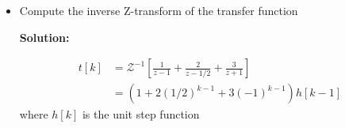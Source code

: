 \documentclass[twoside]{article}
\begin{document}
\begin{itemize}
\begin{align*}
  T(z) &= C \left( z I - G \right)^{-1} H \\
         &= \left[ \begin{array}{ccc} 1 & 2 & 3 \end{array} \right] 
\left[ \begin{array}{ccc} z-1 & 0 & 0\\ 0 & z-1/2 & 0
    \\ 0 & 0 & z+1 \end{array} \right]^{-1}            
\left[ \begin{array}{c} 1 \\ 1 \\ 1\end{array} \right]
\\
&= \left[ \begin{array}{ccc} 1 & 2 & 3 \end{array} \right] 
\left[ \begin{array}{ccc} \frac{1}{z-1} & 0 & 0\\ 0 & \frac{1}{z-1/2} & 0
    \\ 0 & 0 & \frac{1}{z+1} \end{array} \right]            
\left[ \begin{array}{c} 1 \\ 1 \\ 1\end{array} \right]                                        
\\
&= 
\left[ \begin{array}{ccc} 1 & 2 & 3 \end{array} \right] 
\left[ \begin{array}{c} \frac{1}{z-1} \\ \frac{1}{z-1/2} \\
         \frac{1}{z+1}\end{array} \right]          
\\
  T(z) &= \frac{1}{z-1} + \frac{2}{z-1/2} + \frac{3}{z+1}
\end{align*}    

\item Compute the inverse Z-transform of the  transfer function 

\textbf{Solution:}

\begin{align*}
  t[k] &= \mathcal{Z}^{-1} \left[ \frac{1}{z-1} + \frac{2}{z-1/2} +
  \frac{3}{z+1} \right]
\\
&= \left( 1 + 2 (1/2)^{k-1} + 3 (-1)^{k-1} \right) h[k-1]
\end{align*}    
%
where $h[k]$ is the unit step function


\end{itemize}

\end{document}
